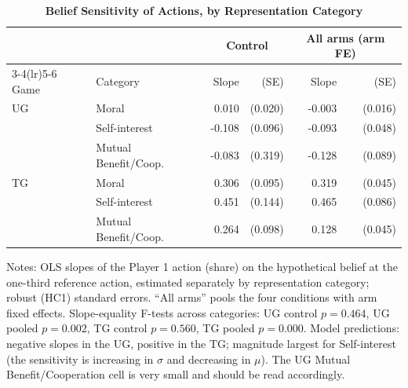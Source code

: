 \begin{table}[!htbp]
\centering
\small
\renewcommand{\arraystretch}{1.2}
\caption{\textbf{Belief Sensitivity of Actions, by Representation Category}}
\label{tab:belief_sensitivity}
\begin{tabular}{ll rr rr}
\toprule
 & & \multicolumn{2}{c}{Control} & \multicolumn{2}{c}{All arms (arm FE)} \\
\cmidrule(lr){3-4}\cmidrule(lr){5-6}
Game & Category & Slope & (SE) & Slope & (SE) \\
\midrule
UG & Moral & 0.010 & (0.020) & -0.003 & (0.016) \\
 & Self-interest & -0.108 & (0.096) & -0.093 & (0.048) \\
 & Mutual Benefit/Coop. & -0.083 & (0.319) & -0.128 & (0.089) \\
\midrule
TG & Moral & 0.306 & (0.095) & 0.319 & (0.045) \\
 & Self-interest & 0.451 & (0.144) & 0.465 & (0.086) \\
 & Mutual Benefit/Coop. & 0.264 & (0.098) & 0.128 & (0.045) \\
\bottomrule
\end{tabular}
\begin{flushleft}
\footnotesize Notes: OLS slopes of the Player 1 action (share) on the hypothetical belief at the one-third reference action, estimated separately by representation category; robust (HC1) standard errors. ``All arms'' pools the four conditions with arm fixed effects. Slope-equality F-tests across categories: UG control $p=0.464$, UG pooled $p=0.002$, TG control $p=0.560$, TG pooled $p=0.000$. Model predictions: negative slopes in the UG, positive in the TG\@; magnitude largest for Self-interest (the sensitivity is increasing in $\sigma$ and decreasing in $\mu$). The UG Mutual Benefit/Cooperation cell is very small and should be read accordingly.
\end{flushleft}
\end{table}
